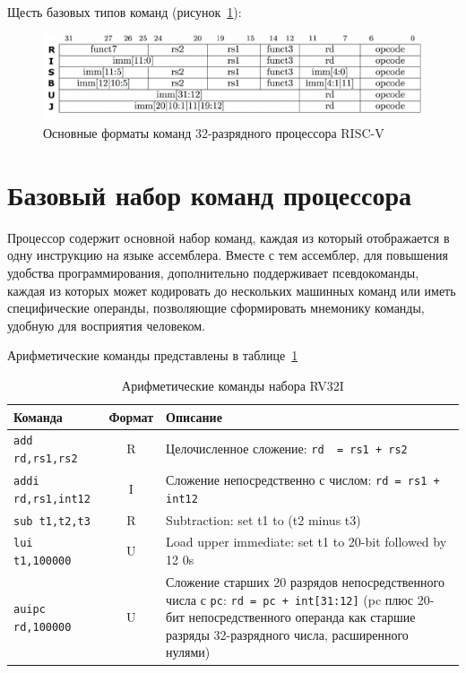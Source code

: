Щесть базовых типов команд (рисунок~\ref{command-02}):

\begin{figure}[htbp]
    \centering
    \includegraphics[width=1.0\textwidth]{img/32-bit-instruction-formats.png}
    \caption{Основные форматы команд 32-разрядного процессора RISC-V}
    \label{command-02}
\end{figure}

\section{Базовый набор команд процессора}

Процессор содержит основной набор команд, каждая из который отображается в одну инструкцию на языке ассемблера. Вместе с тем ассемблер, для повышения удобства программирования, дополнительно поддерживает псевдокоманды, каждая из которых может кодировать до нескольких машинных команд или иметь специфические операнды, позволяющие сформировать мнемонику команды, удобную для восприятия человеком.

Арифметические команды представлены в таблице~\ref{table-base-arithmetic}

\begin{table}[h]
    \caption{Арифметические команды набора RV32I}
    \centering
    \begin{tabularx}{\textwidth}{|l|c|X|}
        \hline
        \textbf{Команда} & \textbf{Формат} & \textbf{Описание} \\
        \hline \verb|add rd,rs1,rs2| & R & Целочисленное сложение: \verb|rd  = rs1 + rs2| \\
        \hline \verb|addi rd,rs1,int12| & I & Сложение непосредственно с числом: \verb|rd = rs1 + int12| \\
        \hline \verb|sub t1,t2,t3| & R & Subtraction: set t1 to (t2 minus t3) \\
        \hline \verb|lui t1,100000| & U & Load upper immediate: set t1 to 20-bit followed by 12 0s \\
        \hline \verb|auipc rd,100000| & U & Сложение старших 20 разрядов непосредственного числа с \verb|pc|: \verb|rd = pc + int[31:12]| (pc плюс 20-бит непосредственного операнда как старшие разряды 32-разрядного числа, расширенного нулями) \\
        \hline
    \end{tabularx}
    \label{table-base-arithmetic}
\end{table}


